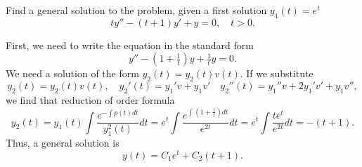 \documentclass[11pt]{article}
\begin{document}
\begin{problem}
Find a general solution to the problem, given a first solution $y_{1}(t)=e^{t}$
\begin{equation*}
ty''-(t+1)y'+y=0, \quad t>0.
\end{equation*}
\end{problem}
\begin{solution}
First, we need to write the equation in the standard form
\[y''-\left( 1 + \tfrac{1}{t} \right) y + \tfrac{1}{t}y=0.\]
We need a solution of the form $y_{2}(t)=y_{2}(t)v(t)$. If we substitute $$y_{2}(t)=y_{2}(t)v(t), \quad y_{2}'(t)=y_{1}'v + y_{1}v' \quad y_{2}''(t)=y_{1}''v + 2y_{1}'v'+ y_{1}v'',$$
we find that reduction of order formula 
\[y_{2}(t)=y_{1}(t)\int \frac{e^{-\int p(t)dt}}{y_{1}^{2}(t)}dt = e^{t}\int \frac{e^{\int \left( 1 + \tfrac{1}{t} \right)dt}}{e^{2t}}dt= e^{t}\int \frac{te^{t}}{e^{2t}}dt=-(t+1).\]
Thus, a general solution is 
\[\boxed{y(t) = C_{1}e^{t} + C_{2}(t+1)}.\]

\end{solution}
\end{document}
